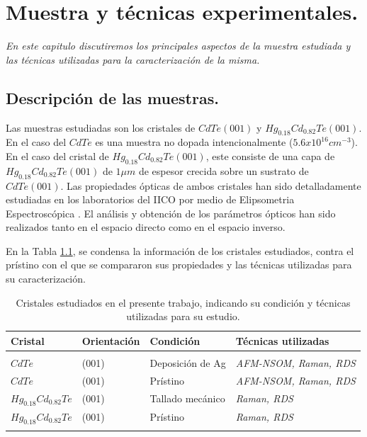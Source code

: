 \chapter{Muestra y técnicas experimentales.}

\label{chap:techniques-and-sample}
\textit{En este capitulo discutiremos los principales aspectos de la muestra estudiada y las técnicas utilizadas para la 
caracterización de la misma.}
\vfill
\minitoc
\newpage

\section{Descripción de las muestras.}
\label{sec:chap3-sample-description}
Las muestras estudiadas son los cristales de $ CdTe(001) $ y $ Hg_{0.18}Cd_{0.82}Te (001)$. En el caso del $ CdTe $ es una muestra no dopada intencionalmente ($ 5.6x10^{16} cm^{-3} $). En el caso del cristal de $ Hg_{0.18}Cd_{0.82}Te (001)$, este consiste de una capa de $ Hg_{0.18}Cd_{0.82}Te (001)$ de $ 1 \mu m $ de espesor crecida sobre un sustrato de $ CdTe(001) $. Las propiedades ópticas de ambos cristales han sido detalladamente estudiadas en los laboratorios del IICO por medio de Elipsometria Espectroscópica \cite{Camacho2005}\cite{LastrasMartnez2009}. El análisis y obtención de los parámetros ópticos han sido realizados tanto en el espacio directo como en el espacio inverso\cite{Camacho2005}\cite{LastrasMartnez2009}.

En la Tabla \ref{tab:crystal_description}, se condensa la información de los cristales estudiados, contra el prístino con el que se compararon sus propiedades y las técnicas utilizadas para su caracterización.

\begin{table}[h!]
    \centering
        \begin{tabular}{m{7em} m{5em} m{8em} m{12em}}
        \hline \hline
        Cristal 		            & Orientación   & Condición     & Técnicas utilizadas\\
        \hline
        & & & \\
        $ CdTe $                    & (001) & Deposición de Ag 	& \textit{AFM-NSOM, Raman, RDS}\\
        $ CdTe $                    & (001) & Prístino          & \textit{AFM-NSOM, Raman, RDS}\\
        $ Hg_{0.18}Cd_{0.82}Te $    & (001) & Tallado mecánico  & \textit{Raman, RDS}\\
        $ Hg_{0.18}Cd_{0.82}Te $    & (001) & Prístino          & \textit{Raman, RDS}\\
        \hline \hline
        \caption{Cristales estudiados en el presente trabajo, indicando su condición y técnicas utilizadas para su estudio.}
    \label{tab:crystal_description}
    \end{tabular}
\end{table}

